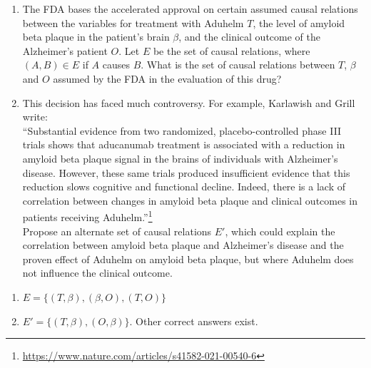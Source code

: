\begin{enumerate}
    \item The FDA bases the accelerated approval on certain assumed causal relations between the variables for treatment with Aduhelm $T$, the level of amyloid beta plaque in the patient's brain $\beta$, and the clinical outcome of the Alzheimer's patient $O$. Let $E$ be the set of causal relations, where $(A,B) \in E$ if $A$ causes $B$. What is the set of causal relations between $T$, $\beta$ and $O$ assumed by the FDA in the evaluation of this drug?
    \item This decision has faced much controversy. For example, Karlawish and Grill write:\\
     ``Substantial evidence from two randomized, placebo-controlled phase III trials shows that aducanumab treatment is associated with a reduction in amyloid beta plaque signal in the brains of individuals with Alzheimer's disease. However, these same trials produced insufficient evidence that this reduction slows cognitive and functional decline. Indeed, there is a lack of correlation between changes in amyloid beta plaque and clinical outcomes in patients receiving Aduhelm.''\footnote{\url{https://www.nature.com/articles/s41582-021-00540-6}}\\
    \bigbreak
     Propose an alternate set of causal relations $E'$, which could explain the correlation between amyloid beta plaque and Alzheimer's disease and the proven effect of Aduhelm on amyloid beta plaque, but where Aduhelm does not influence the clinical outcome.
\end{enumerate}

\begin{gradedsolution}
    \begin{enumerate}
        \item $E = \{(T, \beta), (\beta, O), (T, O)\}$
        \item $E' = \{(T, \beta), (O, \beta)\}$. Other correct answers exist.
    \end{enumerate}
\end{gradedsolution}

